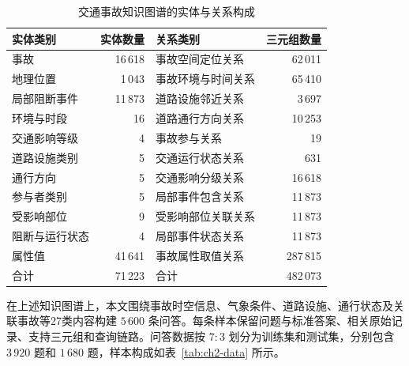 \begin{table}[htbp]
  \centering
  \caption{交通事故知识图谱的实体与关系构成}
  \label{tab:ch2-kg-statistics}
  \fontsize{10.5bp}{13.65bp}\selectfont
  \begin{tabular*}{\linewidth}{@{\extracolsep{\fill}}lrlr@{}}
    \toprule
    实体类别 & 实体数量 & 关系类别 & 三元组数量 \\
    \midrule
    事故 & 16\,618 & 事故空间定位关系 & 62\,011 \\
    地理位置 & 1\,043 & 事故环境与时间关系 & 65\,410 \\
    局部阻断事件 & 11\,873 & 道路设施邻近关系 & 3\,697 \\
    环境与时段 & 16 & 道路通行方向关系 & 10\,253 \\
    交通影响等级 & 4 & 事故参与关系 & 19 \\
    道路设施类别 & 5 & 交通运行状态关系 & 631 \\
    通行方向 & 5 & 交通影响分级关系 & 16\,618 \\
    参与者类别 & 5 & 局部事件包含关系 & 11\,873 \\
    受影响部位 & 9 & 受影响部位关联关系 & 11\,873 \\
    阻断与运行状态 & 4 & 局部事件状态关系 & 11\,873 \\
    属性值 & 41\,641 & 事故属性取值关系 & 287\,815 \\
    \midrule
    合计 & 71\,223 & 合计 & 482\,073 \\
    \bottomrule
  \end{tabular*}
\end{table}

在上述知识图谱上，本文围绕事故时空信息、气象条件、道路设施、通行状态及关联事故等27类内容构建 $5\,600$ 条问答。每条样本保留问题与标准答案、相关原始记录、支持三元组和查询链路。问答数据按 $7:3$ 划分为训练集和测试集，分别包含 $3\,920$ 题和 $1\,680$ 题，样本构成如表~\ref{tab:ch2-data} 所示。


